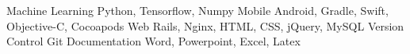 \begin{cvskills}
  \cvskill
    {Machine Learning} 
    {Python, Tensorflow, Numpy} 
  \cvskill
    {Mobile} 
    {Android, Gradle, Swift, Objective-C, Cocoapods}
  \cvskill
    {Web} 
    {Rails, Nginx, HTML, CSS, jQuery, MySQL}
  \cvskill
  	{Version Control}
  	{Git}
  \cvskill
    {Documentation}
    {Word, Powerpoint, Excel, Latex}
\end{cvskills}